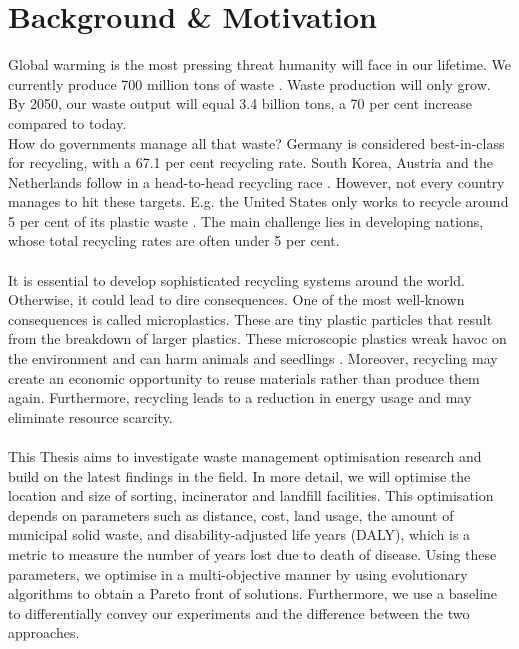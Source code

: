\documentclass[mscthesis, 11pt]{usiinfthesis}
\theoremstyle{newdefinition}
\begin{document}

\tableofcontents 
\listoffigures %
\listoftables %
\listofalgorithms

\mainmatter

\chapter{Background \& Motivation}
Global warming is the most pressing threat humanity will face in our lifetime. We currently produce 700 million tons of waste \cite{oecd_waste_2019}. Waste production will only grow. By 2050, our waste output will equal 3.4 billion tons, a 70 per cent increase compared to today. \cite{tiseo_global_2022} \\
How do governments manage all that waste? Germany is considered best-in-class for recycling, with a 67.1 per cent recycling rate. South Korea, Austria and the Netherlands follow in a head-to-head recycling race \cite{statista_global_2022}.  However, not every country manages to hit these targets. E.g. the United States only works to recycle around 5 per cent of its plastic waste \cite{volcovici_us_2022}. The main challenge lies in developing nations, whose total recycling rates are often under 5 per cent. \cite{statista_global_2022}\\
\\
It is essential to develop sophisticated recycling systems around the world. Otherwise, it could lead to dire consequences. One of the most well-known consequences is called microplastics. These are tiny plastic particles that result from the breakdown of larger plastics. These microscopic plastics wreak havoc on the environment and can harm animals and seedlings \cite{national_geographic_society_microplastics_2022}. Moreover, recycling may create an economic opportunity to reuse materials rather than produce them again. Furthermore, recycling leads to a reduction in energy usage and may eliminate resource scarcity. 
\\\\
This Thesis aims to investigate waste management optimisation research and build on the latest findings in the field. In more detail, we will optimise the location and size of sorting, incinerator and landfill facilities. This optimisation depends on parameters such as distance, cost, land usage, the amount of municipal solid waste, and disability-adjusted life years (DALY), which is a metric to measure the number of years lost due to death of disease. \cite{murray_quantifying_1994} Using these parameters, we optimise in a multi-objective manner by using evolutionary algorithms to obtain a Pareto front of solutions. Furthermore, we use a baseline to differentially convey our experiments and the difference between the two approaches.
\end{document}
